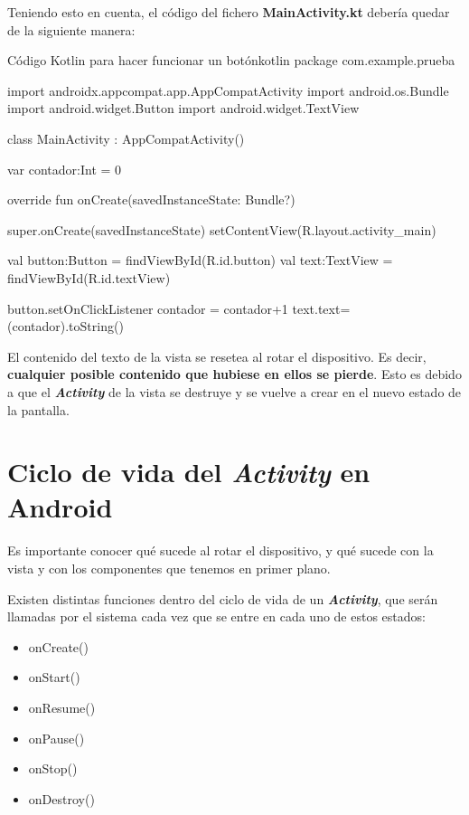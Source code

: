 Teniendo esto en cuenta, el código del fichero \textbf{MainActivity.kt} debería quedar de la siguiente manera:

\begin{mycode}{Código Kotlin para hacer funcionar un botón}{kotlin}{}
package com.example.prueba

import androidx.appcompat.app.AppCompatActivity
import android.os.Bundle
import android.widget.Button
import android.widget.TextView

class MainActivity : AppCompatActivity() {

    var contador:Int = 0

    override fun onCreate(savedInstanceState: Bundle?) {
        super.onCreate(savedInstanceState)
        setContentView(R.layout.activity_main)

        val button:Button = findViewById(R.id.button)
        val text:TextView = findViewById(R.id.textView)

        button.setOnClickListener {
            contador = contador+1
            text.text= (contador).toString()
        }
    }
}
\end{mycode}


El contenido del texto de la vista se resetea al rotar el dispositivo. Es decir, \textbf{cualquier posible contenido que hubiese en ellos se pierde}. Esto es debido a que el \textbf{\textit{Activity}} de la vista se destruye y se vuelve a crear en el nuevo estado de la pantalla.


\chapter{Ciclo de vida del \textit{Activity} en Android}

Es importante conocer qué sucede al rotar el dispositivo, y qué sucede con la vista y con los componentes que tenemos en primer plano.

Existen distintas funciones dentro del ciclo de vida de un \textit{\textbf{Activity}}, que serán llamadas por el sistema cada vez que se entre en cada uno de estos estados:

\begin{itemize}
    \item onCreate()
    \item onStart()
    \item onResume()
    \item onPause()
    \item onStop()
    \item onDestroy()
\end{itemize}

